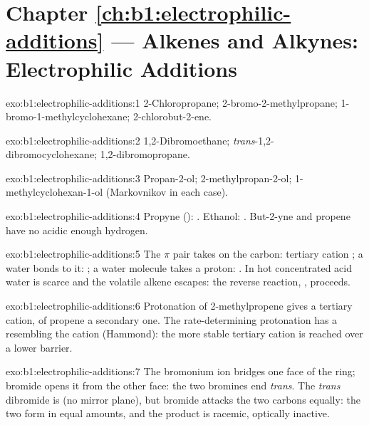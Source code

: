 \section*{Chapter \ref{ch:b1:electrophilic-additions} --- Alkenes and Alkynes: Electrophilic Additions}

\begin{solution}{exo:b1:electrophilic-additions:1}
2-Chloropropane; 2-bromo-2-methylpropane; 1-bromo-1-methylcyclohexane;
2-chlorobut-2-ene.
\end{solution}

\begin{solution}{exo:b1:electrophilic-additions:2}
1,2-Dibromoethane; \textit{trans}-1,2-dibromocyclohexane;
1,2-dibromopropane.
\end{solution}

\begin{solution}{exo:b1:electrophilic-additions:3}
Propan-2-ol; 2-methylpropan-2-ol; 1-methylcyclohexan-1-ol (Markovnikov in
each case).
\end{solution}

\begin{solution}{exo:b1:electrophilic-additions:4}
Propyne (): . Ethanol:
. But-2-yne and propene have no
acidic enough hydrogen.
\end{solution}

\begin{solution}{exo:b1:electrophilic-additions:5}
The $\pi$ pair takes  on the  carbon: tertiary cation
; a water  bonds to it: ; a water
molecule takes a proton: . In hot concentrated acid water is
scarce and the volatile alkene escapes: the reverse reaction, ,
proceeds.
\end{solution}

\begin{solution}{exo:b1:electrophilic-additions:6}
Protonation of 2-methylpropene gives a tertiary cation, of propene a
secondary one. The rate-determining protonation has a 
resembling the cation (Hammond): the more stable tertiary cation is
reached over a lower barrier.
\end{solution}

\begin{solution}{exo:b1:electrophilic-additions:7}
The bromonium ion bridges one face of the ring; bromide opens it from the
other face: the two bromines end \textit{trans}. The \textit{trans}
dibromide is  (no mirror plane), but bromide attacks the two carbons
equally: the two  form in equal amounts, and the product is
racemic, optically inactive.
\end{solution}

